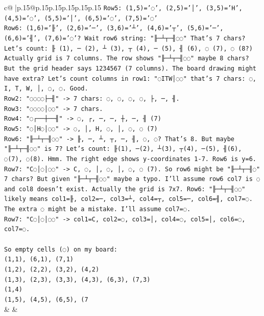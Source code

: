 \documentclass{article}
\begin{document}
{\begin{supertabular}{c@{$\;$}|p{.15\linewidth}@{}p{.15\linewidth}p{.15\linewidth}p{.15\linewidth}p{.15\linewidth}p{.15\linewidth}}
{{{\texttt{Row5: (1,5)='◌', (2,5)='│', (3,5)='H', (4,5)='◌', (5,5)='│', (6,5)='◌', (7,5)='◌'} \\
\texttt{Row6: (1,6)='╟', (2,6)='─', (3,6)='┴', (4,6)='┬', (5,6)='─', (6,6)='╢', (7,6)='◌'? Wait row6 string: "╟─┴┬─╢◌◌" That's 7 chars? Let's count: ╟ (1), ─ (2), ┴ (3), ┬ (4), ─ (5), ╢ (6), ◌ (7), ◌ (8?) Actually grid is 7 columns. The row shows "╟─┴┬─╢◌◌" maybe 8 chars? But the grid header says 1234567 (7 columns). The board drawing might have extra? Let's count columns in row1: "◌ITW│◌◌" that's 7 chars: ◌, I, T, W, │, ◌, ◌. Good.} \\
\texttt{Row2: "◌◌◌◌├─╢" {-}> 7 chars: ◌, ◌, ◌, ◌, ├, ─, ╢.} \\
\texttt{Row3: "◌◌◌◌│◌◌" {-}> 7 chars.} \\
\texttt{Row4: "◌┌──┼──╢" {-}> ◌, ┌, ─, ─, ┼, ─, ╢ (7)} \\
\texttt{Row5: "◌│H◌│◌◌" {-}> ◌, │, H, ◌, │, ◌, ◌ (7)} \\
\texttt{Row6: "╟─┴┬─╢◌◌" {-}> ╟, ─, ┴, ┬, ─, ╢, ◌, ◌? That's 8. But maybe "╟─┴┬─╢◌◌" is 7? Let's count: ╟(1), ─(2), ┴(3), ┬(4), ─(5), ╢(6), ◌(7), ◌(8). Hmm. The right edge shows y{-}coordinates 1{-}7. Row6 is y=6. Row7: "C◌│◌│◌◌" {-}> C, ◌, │, ◌, │, ◌, ◌ (7). So row6 might be "╟─┴┬─╢◌" 7 chars? But given "╟─┴┬─╢◌◌" maybe a typo. I'll assume row6 col7 is ◌ and col8 doesn't exist. Actually the grid is 7x7. Row6: "╟─┴┬─╢◌◌" likely means col1=╟, col2=─, col3=┴, col4=┬, col5=─, col6=╢, col7=◌. The extra ◌ might be a mistake. I'll assume col7=◌.} \\
\texttt{Row7: "C◌│◌│◌◌" {-}> col1=C, col2=◌, col3=│, col4=◌, col5=│, col6=◌, col7=◌.} \\
\\ 
\texttt{So empty cells (◌) on my board:} \\
\texttt{(1,1), (6,1), (7,1)} \\
\texttt{(1,2), (2,2), (3,2), (4,2)} \\
\texttt{(1,3), (2,3), (3,3), (4,3), (6,3), (7,3)} \\
\texttt{(1,4)} \\
\texttt{(1,5), (4,5), (6,5), (7} \\
            }
        }
    }
    & & \\ \\


\end{supertabular}}
\end{document}
